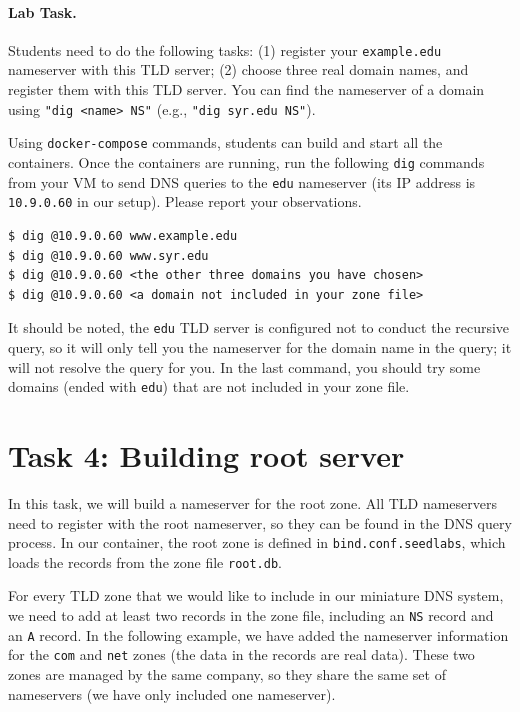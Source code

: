 \paragraph{Lab Task.}
Students need to do the following tasks: (1) register 
your \texttt{example.edu} nameserver with this TLD server;
(2) choose three real domain names, and register them
with this TLD server. You can find the nameserver of a domain
using \texttt{"dig <name> NS"} (e.g., \texttt{"dig syr.edu NS"}). 


Using \texttt{docker-compose} commands, students can 
build and start all the containers. 
Once the containers are running,
run the following \texttt{dig} commands from your VM to
send DNS queries to the \texttt{edu} nameserver (its IP address
is \texttt{10.9.0.60} in our setup). 
Please report your observations. 


\begin{lstlisting}
$ dig @10.9.0.60 www.example.edu
$ dig @10.9.0.60 www.syr.edu
$ dig @10.9.0.60 <the other three domains you have chosen>
$ dig @10.9.0.60 <a domain not included in your zone file>
\end{lstlisting}

It should be noted, the \texttt{edu} TLD server is configured 
not to conduct the recursive query, so it will only tell you
the nameserver for the domain name in the query; it will not
resolve the query for you. In the last command, you should
try some domains (ended with \texttt{edu}) that are not included in your zone file. 


\section{Task 4: Building root server}


In this task, we will build a nameserver for the 
root zone. All TLD nameservers need to register
with the root nameserver, so they can be found
in the DNS query process. 
In our container, the root zone is defined in 
\texttt{bind.conf.seedlabs}, which loads the records 
from the zone file \texttt{root.db}. 


For every TLD zone that we would like to include in our 
miniature DNS system, we need to add at least two records
in the zone file, including an \texttt{NS} record 
and an \texttt{A} record.  In the following example,
we have added the nameserver information for the 
\texttt{com} and \texttt{net} zones (the data in the records are real data).
These two zones are managed by the same company, so they share the 
same set of nameservers (we have only included one nameserver).

